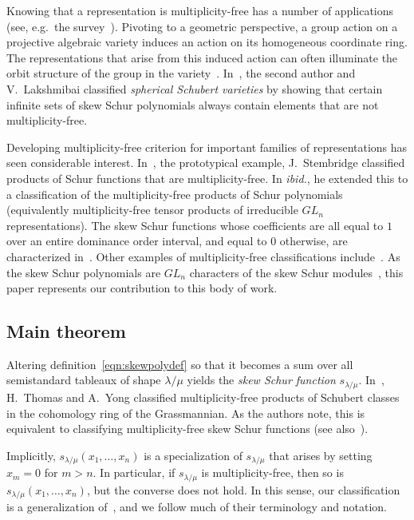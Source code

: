 \documentclass[10pt]{article}
\theoremstyle{definition}
\providecommand{\eg}{e.g.\ }
\begin{document}
Knowing that a representation is multiplicity-free has a number of applications (see, \eg the survey~\cite{H95}). Pivoting to a geometric perspective, a group action on a projective algebraic variety induces an action on its homogeneous coordinate ring. The representations that arise from this induced action can often illuminate the orbit structure of the group in the variety~\cite{AP14,MWZ01,P14,S03}. In~\cite{HL19}, the second author and V.~Lakshmibai classified \emph{spherical Schubert varieties} by showing that certain infinite sets of skew Schur polynomials always contain elements that are not multiplicity-free. 

Developing multiplicity-free criterion for important families of representations has seen considerable interest. In~\cite{S01}, the prototypical example, J.~Stembridge classified products of Schur functions that are multiplicity-free. In \emph{ibid.}, he extended this to a classification of the multiplicity-free products of Schur polynomials (equivalently multiplicity-free tensor products of irreducible $GL_n$ representations). The skew Schur functions whose coefficients are all equal to $1$ over an entire dominance order interval, and equal to $0$ otherwise, are characterized in~\cite{ACM19}. Other examples of multiplicity-free classifications include~\cite{FMS19,G10,TY10}. As the skew Schur polynomials are $GL_n$ characters of the skew Schur modules~\cite{FH91}, this paper represents our contribution to this body of work. 

\subsection{Main theorem} Altering definition~\eqref{eqn:skewpolydef} so that it becomes a sum over all semistandard tableaux of shape $\lambda / \mu$ yields the \emph{skew Schur function} $s_{\lambda / \mu}$. In~\cite{TY10}, H.~Thomas and A.~Yong classified multiplicity-free products of Schubert classes in the cohomology ring of the Grassmannian. As the authors note, this is equivalent to classifying multiplicity-free skew Schur functions (see also~\cite{G10}). 

Implicitly, $s_{\lambda / \mu}(x_1,\ldots,x_n)$ is a specialization of $s_{\lambda / \mu}$ that arises by setting $x_m=0$ for $m > n$. In particular, if $s_{\lambda / \mu}$ is multiplicity-free, then so is $s_{\lambda / \mu}(x_1,\ldots,x_n)$, but the converse does not hold. In this sense, our classification is a generalization of~\cite{TY10}, and we follow much of their terminology and notation.
\end{document}
